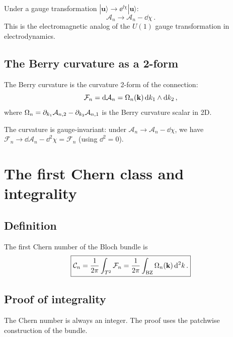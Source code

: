 Under a gauge transformation $|\mathbf{u}\rangle\to\ee^{\ii\chi}
|\mathbf{u}\rangle$:
\begin{equation}\label{eq:appB-gauge-transform}
  \mathcal{A}_n\to\mathcal{A}_n-\dd\chi\,.
\end{equation}
This is the electromagnetic analog of the $U(1)$ gauge transformation
in electrodynamics.

\subsection{The Berry curvature as a 2-form}
\label{sec:appB-berry-2form}

The Berry curvature is the curvature 2-form of the connection:
\begin{equation}\label{eq:appB-berry-curvature}
  \mathcal{F}_n = \mathrm{d}\mathcal{A}_n
  = \Omega_n(\mathbf{k})\,\mathrm{d} k_1\wedge\mathrm{d} k_2\,,
\end{equation}
where $\Omega_n=\partial_{k_1}\mathcal{A}_{n,2}
-\partial_{k_2}\mathcal{A}_{n,1}$ is the Berry curvature scalar in 2D.

The curvature is gauge-invariant: under $\mathcal{A}_n\to
\mathcal{A}_n-\dd\chi$, we have $\mathcal{F}_n\to\dd\mathcal{A}_n
-\dd^2\chi=\mathcal{F}_n$ (using $\dd^2=0$).

\section{The first Chern class and integrality} \cite{kane2005sub}
\label{sec:appB-chern-class}

\subsection{Definition}
\label{sec:appB-chern-def}

The first Chern number of the Bloch bundle is
\begin{equation}\label{eq:appB-chern}
  \boxed{%
  \Chern_n = \frac{1}{2\pi}\int_{T^2}\mathcal{F}_n
  = \frac{1}{2\pi}\int_\BZ\Omega_n(\kvec)\,\dd^2k\,.}
\end{equation}

\subsection{Proof of integrality}
\label{sec:appB-integrality}

The Chern number is always an integer.  The proof uses the
patchwise construction of the bundle.


